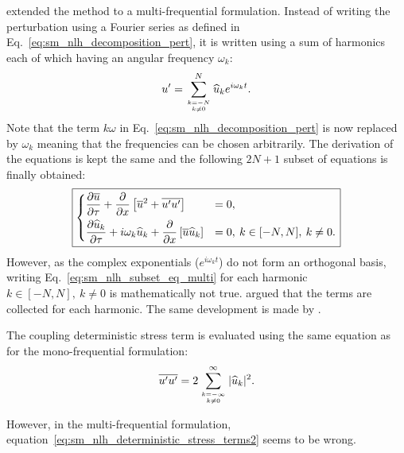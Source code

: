 \citet{He2002} extended the method to a multi-frequential
formulation. Instead of writing the perturbation
using a Fourier series as defined in Eq.~\eqref{eq:sm_nlh_decomposition_pert},
it is written using a sum of harmonics each of which
having an angular frequency $\omega_k$:
\begin{equation}
	u^\prime = \sum_{\genfrac{}{}{0pt}{}{k=-N}{k \neq 0}}^{N} 
	\widehat{u}_k e^{i \omega_k t}.
	\label{eq:sm_nlh_decomposition_pert_multi}
\end{equation}
Note that the term $k \omega$ in Eq.~\eqref{eq:sm_nlh_decomposition_pert}
is now replaced by $\omega_k$ meaning that the frequencies can be chosen
arbitrarily.
The derivation of the equations is kept the same and the following
$2N+1$ subset of equations is finally obtained:
\begin{equation}
	\fbox{$
	\begin{dcases}
		\frac{\partial \overline{u}}{\partial \tau} +
		\frac{\partial}{\partial x}
			\left[\overline{u}^2 + 
			\overline{u^\prime u^\prime}\right] &=
			0, \\
		\frac{\partial \widehat{u}_k}{\partial \tau} + 
		i \omega_k \widehat{u}_k + 
			\frac{\partial}{\partial x} 
			\left[ \overline{u} \widehat{u}_k\right] &= 
			0, \: k \in [-N, N], \: k \neq 0.
	\end{dcases}
	$}
	\label{eq:sm_nlh_subset_eq_multi}
\end{equation}
However, as the complex exponentials 
($e^{i \omega_k t}$) do not form
an orthogonal basis, writing Eq.~\eqref{eq:sm_nlh_subset_eq_multi}
for each harmonic $k \in [-N, N], \: k \neq 0$ is mathematically
not true. \citet{He2002} argued that the terms
are collected for each harmonic. 
The same development is made by \citet{Vilmin2006}.

The coupling deterministic stress term is evaluated using the
same equation as for the mono-frequential formulation:
\begin{equation}
	\overline{u^\prime u^\prime} = 
	2 \sum_{\genfrac{}{}{0pt}{}{k=-\infty}{k \neq 0}}^{\infty} |\widehat{u}_k|^2.
	\label{eq:sm_nlh_deterministic_stress_terms2}
\end{equation}


However, in the multi-frequential formulation, 
equation~\eqref{eq:sm_nlh_deterministic_stress_terms2}
seems to be wrong.


